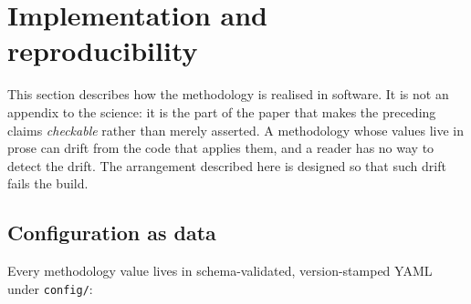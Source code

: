 \section{Implementation and reproducibility}
\label{sec:implementation}

This section describes how the methodology is realised in software. It is not
an appendix to the science: it is the part of the paper that makes the
preceding claims \emph{checkable} rather than merely asserted. A methodology
whose values live in prose can drift from the code that applies them, and a
reader has no way to detect the drift. The arrangement described here is
designed so that such drift fails the build.

\subsection{Configuration as data}
\label{sec:config-as-data}

Every methodology value lives in schema-validated, version-stamped YAML under
\texttt{config/}:

